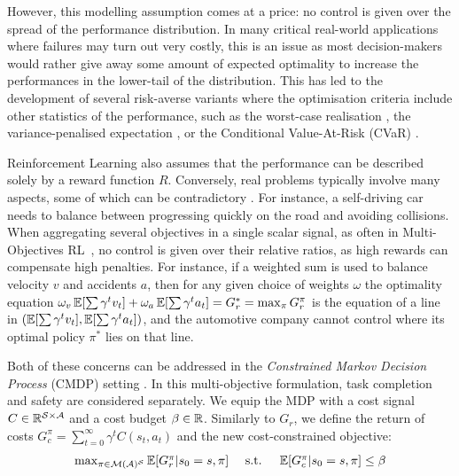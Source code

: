 \documentclass{article}
\begin{document}
However, this modelling assumption comes at a price: no control is given over the spread of the performance distribution. In many critical real-world applications where failures may turn out very costly, this is an issue as most decision-makers would rather give away some amount of expected optimality to increase the performances in the lower-tail of the distribution. This has led to the development of several risk-averse variants where the optimisation criteria include other statistics of the performance, such as the worst-case realisation \citep{Iyengar2005,Nilim2005,Wiesemann2013}, the variance-penalised expectation \citep{Garcia2015,Tamar2012}, or the Conditional Value-At-Risk (CVaR) \citep{Chow2014,DBLP:journals/corr/ChowGJP15}.

Reinforcement Learning also assumes that the performance can be described solely by a reward function $R$. Conversely, real problems typically involve many aspects, some of which can be contradictory \citep{ChunmingLiu2014}. For instance, a self-driving car needs to balance between progressing quickly on the road and avoiding collisions. When aggregating several objectives in a single scalar signal, as often in Multi-Objectives RL~\citep{Roijers2013ASO}, no control is given over their relative ratios, as high rewards can compensate high penalties. For instance, if a weighted sum is used to balance velocity $v$ and accidents $a$, then for any given choice of weights $\omega$ the optimality equation $\omega_v\operatorname*{\mathbb{E}}[\sum\gamma^t v_t] + \omega_a\operatorname*{\mathbb{E}}[\sum\gamma^t a_t] = G_r^* = \max_\pi G^\pi_r$ is the equation of a line in $(\operatorname*{\mathbb{E}}[\sum\gamma^t v_t], \operatorname*{\mathbb{E}}[\sum\gamma^t a_t])$, and the automotive company cannot control where its optimal policy $\pi^*$ lies on that line.

Both of these concerns can be addressed in the \emph{Constrained Markov Decision Process} (CMDP) setting \citep{BEUTLER1985236,Altman95constrainedmarkov}. In this multi-objective formulation, task completion and safety are considered separately. We equip the MDP with a cost signal $C \in \mathbb{R}^{\mathcal{S}\times \mathcal{A}}$ and a cost budget $\beta\in\mathbb{R}$. Similarly to $G_r$, we define the return of costs $G_c^\pi = \sum_{t=0}^\infty \gamma^t C(s_t, a_t)$ and the new cost-constrained objective:
\begin{equation}
\label{eq:cmdp}
\begin{array}{lcr}
 \max_{\pi\in\mathcal{M}(\mathcal{A})^{\mathcal{S}}} \operatorname*{\mathbb{E}}[G_r^\pi | s_0=s, \pi] & \text{ s.t. } & \operatorname*{\mathbb{E}}[G_c^\pi | s_0=s, \pi] \leq \beta
\end{array}
\end{equation}
\end{document}
